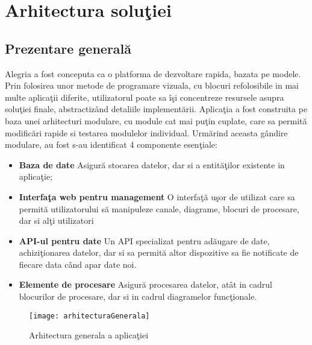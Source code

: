 \chapter{Arhitectura soluţiei}

\section{Prezentare generală}
Alegria a fost conceputa ca o platforma de dezvoltare rapida, bazata pe modele. Prin folosirea unor metode de programare vizuala, cu blocuri refolosibile in mai multe aplicaţii diferite, utilizatorul poate sa îşi concentreze resursele asupra soluţiei finale, abstractizând detaliile implementării. 
Aplicaţia a fost construita pe baza unei arhitecturi modulare, cu module cat mai puţin cuplate, care sa permită modificări rapide si testarea modulelor individual. Urmărind aceasta gândire modulare, au fost s-au identificat 4 componente esenţiale: 
\begin{itemize}
	\item \textbf{Baza de date} Asigură stocarea datelor, dar si a entităţilor existente in aplicaţie;
	\item \textbf{Interfaţa web pentru management} O interfaţă uşor de utilizat care sa permită  utilizatorului să manipuleze canale, diagrame, blocuri de procesare, dar si alţi utilizatori
	\item \textbf{API-ul pentru date} Un API specializat pentru adăugare de date, achiziţionarea datelor, dar si sa permită altor dispozitive sa fie notificate de fiecare data când apar date noi.
	\item \textbf{Elemente de procesare} Asigură procesarea datelor, atât in cadrul blocurilor de procesare, dar si in cadrul diagramelor funcţionale.
\end{itemize}
\begin{figure}
	\centering
	\texttt{[image: arhitecturaGenerala]}
	\caption{Arhitectura generala a aplicaţiei}
	\label{fig:arhitecture}
\end{figure}

